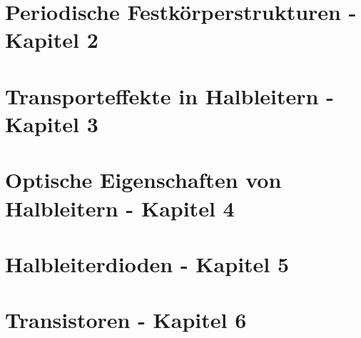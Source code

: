 \documentclass{article}
\begin{document}
\section{Periodische Festkörperstrukturen - Kapitel 2}


\section{Transporteffekte in Halbleitern - Kapitel 3}


\section{Optische Eigenschaften von Halbleitern - Kapitel 4}


\section{Halbleiterdioden - Kapitel 5}



\section{Transistoren - Kapitel 6}\label{k6:transistoren}

\end{document}
